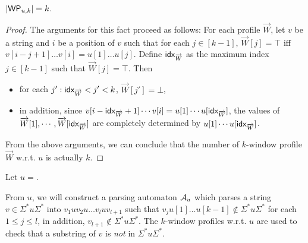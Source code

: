 \begin{proposition}
$|\mathsf{WP}_{u,k}|=k$.
\end{proposition}
\begin{proof}
The arguments for this fact proceed as follows: For each profile $\overrightarrow{W}$, let $v$ be a string and $i$ be a position of $v$ such that for each $j \in [k-1]$, $\overrightarrow{W}[j] = \top$ iff $v[i-j+1] \dots v[i] = u[1] \dots u[j]$. Define ${\sf idx}_{\overrightarrow{W}}$ as the maximum index $j \in [k-1]$ such that $\overrightarrow{W}[j]=\top$. Then 
\begin{itemize}
	\item for each $j': {\sf idx}_{\overrightarrow{W}} < j' < k$, $\overrightarrow{W}[j']=\bot$, 
	\item in addition, since $v[i-{\sf idx}_{\overrightarrow{W}}+1] \cdots v[i] = u[1] \cdots u[{\sf idx}_{\overrightarrow{W}}]$, the values of $\overrightarrow{W}[1],\cdots, \overrightarrow{W}[{\sf idx}_{\overrightarrow{W}}]$ are completely determined by $u[1] \cdots u[{\sf idx}_{\overrightarrow{W}}]$.
\end{itemize}
From the above arguments, we can  conclude that the number of $k$-window profile $\vec{W}$ w.r.t. $u$ is actually $k$.
\end{proof}

\begin{example}
Let $u = $.
\end{example}

From $u$, we will construct a parsing automaton $\mathcal{A}_u$ which parses a string $v \in \Sigma^\ast u \Sigma^\ast$ into $v_1 u v_2 u \dots v_l u v_{l+1}$ such that $v_j u[1] \dots u[k-1] \not \in \Sigma^\ast u \Sigma^\ast$ for each $1 \le j \le l$, in addition, $v_{l+1} \not \in \Sigma^\ast u \Sigma^\ast$. 
The $k$-window profiles w.r.t. $u$ are used to check that a substring of $v$ is \emph{not} in $\Sigma^\ast u \Sigma^\ast$.

